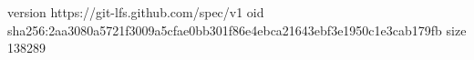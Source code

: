 version https://git-lfs.github.com/spec/v1
oid sha256:2aa3080a5721f3009a5cfae0bb301f86e4ebca21643ebf3e1950c1e3cab179fb
size 138289
